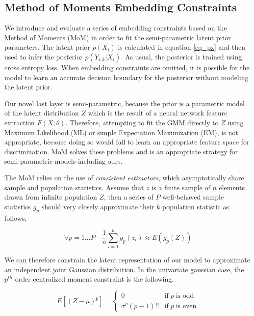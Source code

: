 \documentclass[10pt,twocolumn,letterpaper]{article}
\begin{document}
\subsection{Method of Moments Embedding Constraints}

We introduce and evaluate a series of embedding constraints based on the Method of Moments (MoM) \cite{pearson1936method} in order to fit the semi-parametric latent prior parameters.  
The latent prior $p(X_i)$ is calculated in equation \ref{eq_px} and then used to infer the posterior $p(Y_{i,k}|X_i)$.
As usual, the posterior is trained using cross entropy loss.  
When embedding constraints are omitted, it is possible for the model to learn an accurate decision boundary for the posterior without modeling the latent prior.

Our novel last layer is semi-parametric, because the prior is a parametric model of the latent distribution $Z$ which is the result of a neural network feature extraction $F(X;\theta)$. 
Therefore, attempting to fit the GMM directly to $Z$ using Maximum Likelihood (ML) or simple Expectation Maximization (EM), is not appropriate, because doing so would fail to learn an appropriate feature space for discrimination.
MoM solves these problems and is an appropriate strategy for semi-parametric models including ours.

The MoM relies on the use of \textit{consistent estimators}, which asymptotically share sample and population statistics.
Assume that $z$ is a finite sample of $n$ elements drawn from infinite population $Z$, then a series of $P$ well-behaved sample statistics $g_p$ should very closely approximate their $k$ population statistic as follows,

\begin{equation}
	\forall p=1 \dots P \quad
	\frac{1}{n} \sum_{i=1}^n g_p(z_i) \approx E(g_p(Z))
\end{equation}

We can therefore constrain the latent representation of our model to approximate an independent joint Gaussian distribution. 
In the univariate gaussian case, the $p^{th}$ order centralized moment constraint is the following.

\begin{equation}
	E\left[ (Z-\mu)^p \right] = 
	\begin{cases} 
		0 &  \text{if} \; p \; \text{is odd} \\
		\sigma^p(p - 1)!! & \text{if} \; p \; \text{is even}
	\end{cases}
\end{equation}
\end{document}
